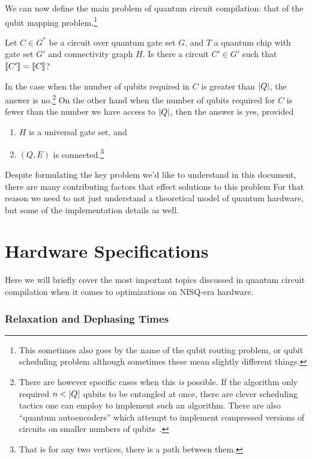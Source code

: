 We can now define the main problem of quantum circuit compilation: that of the qubit mapping problem.\footnote{This sometimes also goes by the name of the qubit routing problem, or qubit scheduling problem although sometimes these mean slightly different things.}
\begin{question}
    Let $C \in G^*$ be a circuit over quantum gate set $G$, and $T$ a quantum chip with gate set $G'$ and connectivity graph $H$.
    Is there a circuit $C' \in G'$ such that $\llbracket C'\rrbracket = \llbracket C\rrbracket$?
\end{question}
In the case when the number of qubits required in $C$ is greater than $\abs{Q}$, the answer is no.\footnote{There are however specific cases when this \emph{is} possible. If the algorithm only required $n < \abs{Q}$ qubits to be entangled at once, there are clever scheduling tactics one can employ to implement such an algorithm. There are also ``quantum autoencoders'' which attempt to implement compressed versions of circuits on smaller numbers of qubits~\cite{autoencode}.}
On the other hand when the number of qubits required for $C$ is fewer than the number we have access to $\abs{Q}$, then the answer is yes, provided
\begin{enumerate}
    \item $H$ is a universal gate set, and
    \item $(Q, E)$ is connected.\footnote{That is for any two vertices, there is a path between them.}
\end{enumerate}
Despite formulating the key problem we'd like to understand in this document, there are many contributing factors that effect solutions to this problem
For that reason we need to not just understand a theoretical model of quantum hardware, but some of the implementation details as well.

\section{Hardware Specifications}

Here we will briefly cover the most important topics discussed in quantum circuit compilation when it comes to optimizations on \ac{NISQ}-era hardware.

\subsubsection{Relaxation and Dephasing Times}\label{sec:Ttimes}

